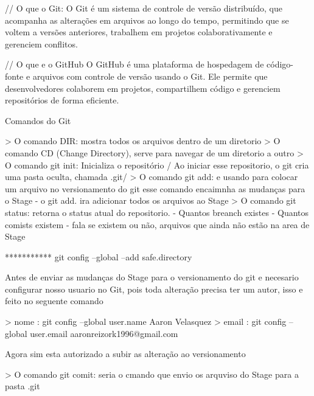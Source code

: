 // O que o Git:
O Git é um sistema de controle de versão distribuído, que acompanha as alterações em arquivos ao longo do tempo, 
permitindo que se voltem a versões anteriores, trabalhem em projetos colaborativamente e gerenciem conflitos.

// O que e o GitHub
O GitHub é uma plataforma de hospedagem de código-fonte e arquivos com controle de versão usando o Git. 
Ele permite que desenvolvedores colaborem em projetos, compartilhem código e gerenciem repositórios de forma eficiente.


Comandos do Git 

> O comando DIR: mostra todos os arquivos dentro de um diretorio
> O comando CD (Change Directory), serve para navegar de um diretorio a outro
> O comando git init: Inicializa o repositório / Ao iniciar esse repositorio, o git
    cria uma pasta oculta, chamada .git/
> O comando git add:  e usando para colocar um arquivo no versionamento do git
    esse comando encaimnha as mudanças para o Stage
    - o git add. ira adicionar todos os arquivos ao Stage 
> O comando git status: retorna o status atual do repositorio. 
    - Quantos breanch existes
    - Quantos comists existem
    - fala se existem ou não, arquivos que ainda não estão na area de Stage

   *********** git config --global --add safe.directory

Antes de enviar as mudanças do Stage para o versionamento do git e necesario configurar nosso
usuario no Git, pois toda alteração precisa ter um autor, isso e feito no seguente comando

> nome : git config --global user.name Aaron Velasquez
> email : git config --global user.email aaronreizork1996@gmail.com

Agora sim esta autorizado a subir as alteração ao versionamento

> O comando git comit: seria  o cmando que envio os arquviso do Stage para a pasta .git


 